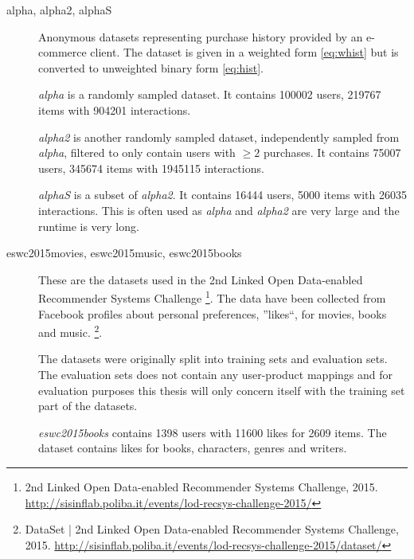 \begin{description}
    \item[alpha, alpha2, alphaS] \hfill

        Anonymous datasets representing purchase history provided by an e-commerce client. The dataset is given in a weighted form \eqref{eq:whist} but is converted to unweighted binary form \eqref{eq:hist}.

        \textit{alpha} is a randomly sampled dataset. It contains 100002 users, 219767 items with 904201 interactions.

        \textit{alpha2} is another randomly sampled dataset, independently sampled from \textit{alpha}, filtered to only contain users with $\geq 2$ purchases. It contains 75007 users, 345674 items with 1945115 interactions.

        \textit{alphaS} is a subset of \textit{alpha2}. It contains 16444 users, 5000 items with 26035 interactions. This is often used as \textit{alpha} and \textit{alpha2} are very large and the runtime is very long.




    \item[eswc2015movies, eswc2015music, eswc2015books] \hfill

        These are the datasets used in the 2nd Linked Open Data-enabled Recommender Systems Challenge
        \footnote{2nd Linked Open Data-enabled Recommender Systems Challenge, 2015. \url{http://sisinflab.poliba.it/events/lod-recsys-challenge-2015/}}.
        The data have been collected from Facebook profiles about personal preferences, ''likes``, for movies, books and music.
        \footnote{DataSet | 2nd Linked Open Data-enabled Recommender Systems Challenge, 2015. \url{http://sisinflab.poliba.it/events/lod-recsys-challenge-2015/dataset/}}.

        The datasets were originally split into training sets and evaluation sets. The evaluation sets does not contain any user-product mappings and for evaluation purposes this thesis will only concern itself with the training set part of the datasets.

        \textit{eswc2015books} contains 1398 users with 11600 likes for 2609 items. The dataset contains likes for books, characters, genres and writers.


\end{description}
